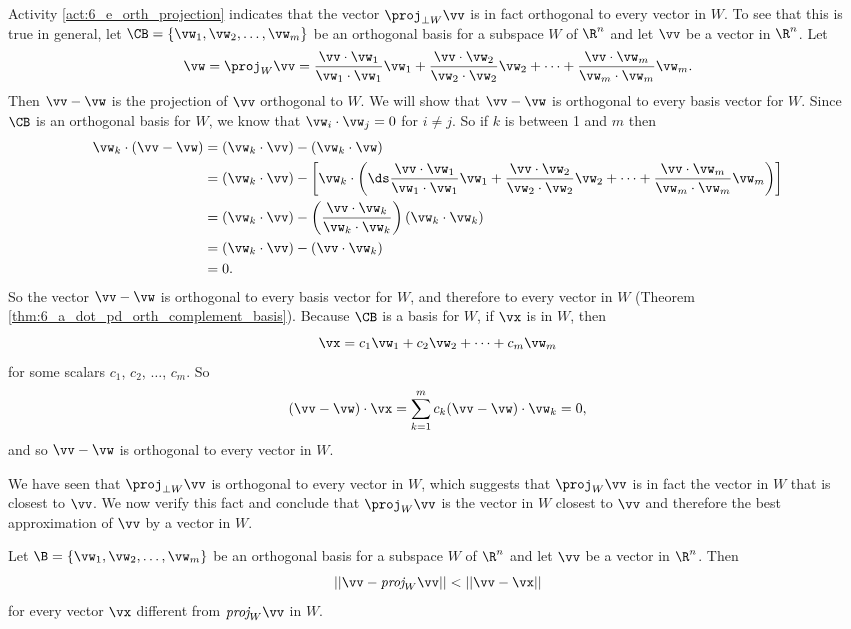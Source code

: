 Activity \ref{act:6_e_orth_projection} indicates that the vector $\proj_{\perp W} \vv$ is in fact orthogonal to every vector in $W$. To see that this is true in general, let $\CB = \{\vw_1, \vw_2, \ldots, \vw_m\}$ be an orthogonal basis for a subspace $W$ of $\R^n$ and let $\vv$ be a vector in $\R^n$. Let 
\[\vw =  \proj_W \vv = \frac{\vv \cdot \vw_1}{\vw_1 \cdot \vw_1} \vw_1 + \frac{\vv \cdot \vw_2}{\vw_2 \cdot \vw_2}  \vw_2 + \cdots + \frac{\vv \cdot \vw_m}{\vw_m \cdot \vw_m}  \vw_m.\]
Then $\vv - \vw$ is the projection of $\vv$ orthogonal to $W$. We will show that $\vv - \vw$ is orthogonal to every basis vector for $W$. Since $\CB$ is an orthogonal basis for $W$, we know that $\vw_i \cdot \vw_j = 0$ for $i \neq j$. So if $k$ is between 1 and $m$ then
\begin{align*}
\vw_k \cdot (\vv - \vw) &= (\vw_k \cdot \vv) - (\vw_k \cdot \vw) \\
	&= (\vw_k \cdot \vv) - \left[\vw_k \cdot \left(\ds \frac{\vv \cdot \vw_1}{\vw_1 \cdot \vw_1} \vw_1 + \frac{\vv \cdot \vw_2}{\vw_2 \cdot \vw_2}  \vw_2 + \cdots + \frac{\vv \cdot \vw_m}{\vw_m \cdot \vw_m}  \vw_m \right)\right] \\
	&= (\vw_k \cdot \vv) - \left(\frac{\vv \cdot \vw_k}{\vw_k \cdot \vw_k}\right) (\vw_k \cdot \vw_k) \\
	&= (\vw_k \cdot \vv) - (\vv \cdot \vw_k) \\
	&= 0.
\end{align*}
So the vector $\vv - \vw$ is orthogonal to every basis vector for $W$, and therefore to every vector in $W$ (Theorem \ref{thm:6_a_dot_pd_orth_complement_basis}).  Because $\CB$ is a basis for $W$, if $\vx$ is in $W$, then 
\[\vx = c_1 \vw_1 + c_2 \vw_2 + \cdots + c_m \vw_m\]
for some scalars $c_1$, $c_2$, $\ldots$, $c_m$. So 
\[(\vv - \vw) \cdot \vx = \sum_{k=1}^m c_k (\vv - \vw) \cdot \vw_k = 0,\]
and so $\vv - \vw$ is orthogonal to every vector in $W$. 

\label{sec:best_approx}

We have seen that $\proj_{\perp W} \vv$ is orthogonal to every vector in $W$, which suggests that $\proj_W \vv$ is in fact the vector in $W$ that is closest to $\vv$. We now verify this fact and conclude that $\proj_W \vv$ is the vector in $W$ closest to $\vv$ and therefore the best approximation of $\vv$ by a vector in $W$.

\begin{theorem} Let $\B = \{\vw_1, \vw_2, \ldots, \vw_m\}$ be an orthogonal basis for a subspace $W$ of $\R^n$ and let $\vv$ be a vector in $\R^n$. Then
\[||\vv - \emph{proj}_W \vv || < || \vv - \vx ||\]
for every vector $\vx$ different from $\emph{proj}_W \vv$ in $W$.
\end{theorem}


